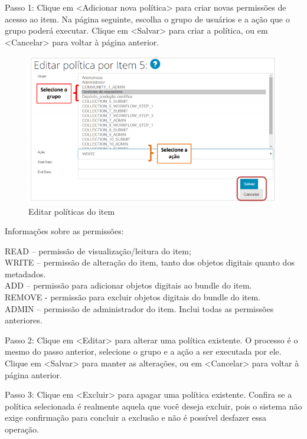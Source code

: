 \documentclass[12pt,hidelinks]{article}
\begin{document}
    Passo 1: Clique em <Adicionar nova política> para criar novas permissões de acesso ao item. Na página seguinte, escolha o grupo de usuários e a ação que o grupo poderá executar. Clique em <Salvar> para criar a política, ou em <Cancelar> para voltar à página anterior.
    
    \begin{figure}[!htp]
                \centering
                \includegraphics[scale=0.8]{figura/Figura113.png}
                \caption{Editar políticas do item}
            \label{Rotulo}
        \end{figure}
        
\newpage

    Informações sobre as permissões:
    
    \singlespacing
    
    READ – permissão de visualização/leitura do item; \\
    WRITE – permissão de alteração do item, tanto dos objetos digitais quanto dos metadados. \\
    ADD – permissão para adicionar objetos digitais ao bundle do item. \\
    REMOVE - permissão para excluir objetos digitais do bundle do item. \\
    ADMIN – permissão de administrador do item. Inclui todas as permissões anteriores.
    
    Passo 2: Clique em <Editar> para alterar uma política existente. O processo é o mesmo do passo anterior, selecione o grupo e a ação a ser executada por ele. Clique em <Salvar> para manter as alterações, ou em <Cancelar> para voltar à página anterior.
    
    \singlespacing
    
    Passo 3: Clique em <Excluir> para apagar uma política existente. Confira se a política selecionada é realmente aquela que você deseja excluir, pois o sistema não exige confirmação para concluir a exclusão e não é possível desfazer essa operação.
    
\end{document}
